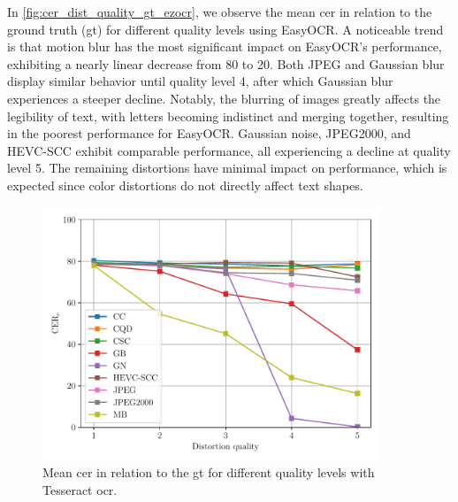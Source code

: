 In \autoref{fig:cer_dist_quality_gt_ezocr}, we observe the mean \gls{cer} in relation to the ground truth (\gls{gt}) for different quality levels using EasyOCR.
A noticeable trend is that motion blur has the most significant impact on EasyOCR's performance, exhibiting a nearly linear decrease from 80 to 20.
Both JPEG and Gaussian blur display similar behavior until quality level 4, after which Gaussian blur experiences a steeper decline.
Notably, the blurring of images greatly affects the legibility of text, with letters becoming indistinct and merging together, resulting in the poorest performance for EasyOCR.
Gaussian noise, JPEG2000, and HEVC-SCC exhibit comparable performance, all experiencing a decline at quality level 5.
The remaining distortions have minimal impact on performance, which is expected since color distortions do not directly affect text shapes.

\begin{figure}[h]
\centering
    \includegraphics[width=0.9\textwidth]{../../images/analyze/cer_dist_quality_gt_tess.pdf}
    \caption{Mean \gls{cer} in relation to the \gls{gt} for different quality levels with Tesseract \gls{ocr}.}
\label{fig:cer_dist_quality_gt_tesseract}
\end{figure}

